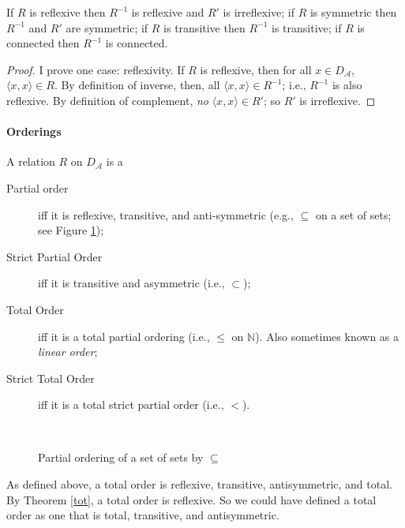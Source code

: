 \begin{theorem}
	If $R$ is reflexive then $R^{-1}$ is reflexive and $R'$ is irreflexive; if $R$ is symmetric then $R^{-1}$ and $R'$ are symmetric; if $R$ is transitive then $R^{-1}$ is transitive; if $R$ is connected then $R^{-1}$ is connected.
\begin{proof}
	I prove one case: reflexivity. If $R$ is reflexive, then for all $x \in D_{\mathscr{A}}$, $\langle x,x\rangle \in R$. By definition of inverse, then, all $\langle x,x\rangle \in R^{-1}$; i.e., $R^{-1}$ is also reflexive.  By definition of complement, \emph{no} $\langle x,x\rangle \in R'$; so $R'$ is irreflexive.
\end{proof}\end{theorem}



\paragraph{Orderings}
\begin{definition}[Ordering]
	A relation $R$ on $D_{\mathscr{A}}$ is a \begin{description}
		\item [Partial order] iff it is reflexive, transitive, and anti-symmetric (e.g., $\subseteq$ on a set of sets; see Figure \ref{fthree});
		\item [Strict Partial Order] iff it is transitive and asymmetric (i.e., $\subset$);
		\item [Total Order] iff it is a total partial ordering (i.e., $\leqslant$ on $\mathbb{N}$). Also sometimes known as a \emph{linear order};
		\item [Strict Total Order] iff it is a total strict partial order (i.e., $<$).
	\end{description} 
\end{definition}

\begin{figure}
	\centering ~{
	}\caption{Partial ordering of a set of sets by $\subseteq$\label{fthree}}
\end{figure}

As defined above, a total order is reflexive, transitive, antisymmetric, and total. By Theorem \ref{tot}, a total order is reflexive. So we could have defined a total order as one that is total, transitive, and antisymmetric.

